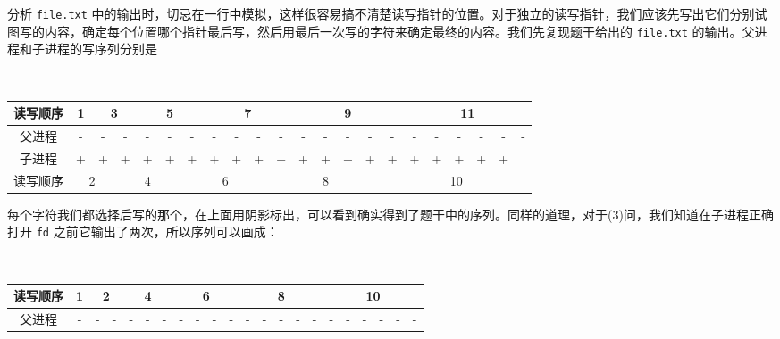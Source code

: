 \begin{problems}
        分析 \verb|file.txt| 中的输出时，切忌在一行中模拟，这样很容易搞不清楚读写指针的位置。对于独立的读写指针，我们应该先写出它们分别试图写的内容，确定每个位置哪个指针最后写，然后用最后一次写的字符来确定最终的内容。我们先复现题干给出的 \verb|file.txt| 的输出。父进程和子进程的写序列分别是
        \begin{table}[H]
            \tt
            \centering
            \begin{tabular}{cccccccccccccccccccccc}
                读写顺序 & \multicolumn{1}{c|}{1} & \multicolumn{2}{c|}{3} & \multicolumn{3}{c|}{5} & \multicolumn{4}{c|}{7} & \multicolumn{5}{c|}{9} & \multicolumn{6}{c}{11} \\ \hline
                父进程 & \multicolumn{1}{c|}{-} & \cellcolor{blue!10}- & \multicolumn{1}{c|}{-} & \cellcolor{blue!10}- & \cellcolor{blue!10}- & \multicolumn{1}{c|}{-} & \cellcolor{blue!10}- & \cellcolor{blue!10}- & \cellcolor{blue!10}- & \multicolumn{1}{c|}{-} & \cellcolor{blue!10}- & \cellcolor{blue!10}- & \cellcolor{blue!10}- & \cellcolor{blue!10}- & \multicolumn{1}{c|}{-} & \cellcolor{blue!10}- & \cellcolor{blue!10}- & \cellcolor{blue!10}- & \cellcolor{blue!10}- & \cellcolor{blue!10}- & \cellcolor{blue!10}- \\
                子进程 & \cellcolor{blue!10}+ & \multicolumn{1}{c|}{+} & \cellcolor{blue!10}+ & + & \multicolumn{1}{c|}{+} & \cellcolor{blue!10}+ & + & + & \multicolumn{1}{c|}{+} & \cellcolor{blue!10}+ & + & + & + & \multicolumn{1}{c|}{+} & \cellcolor{blue!10}+ & + & + & + & + & + &  \\ \hline
                读写顺序 & \multicolumn{2}{c|}{2} & \multicolumn{3}{c|}{4} & \multicolumn{4}{c|}{6} & \multicolumn{5}{c|}{8} & \multicolumn{7}{c}{10}
            \end{tabular}
        \end{table}
        每个字符我们都选择后写的那个，在上面用阴影标出，可以看到确实得到了题干中的序列。同样的道理，对于(3)问，我们知道在子进程正确打开 \verb|fd| 之前它输出了两次，所以序列可以画成：
        \begin{table}[H]
            \tt
            \centering
            \begin{tabular}{cccc|cccccccccccccccccc}
                读写顺序 & \multicolumn{1}{c|}{1} & \multicolumn{2}{c|}{2} & \multicolumn{3}{c|}{4} & \multicolumn{4}{c|}{6} & \multicolumn{5}{c|}{8} & \multicolumn{6}{c}{10} \\ \hline
                父进程 & \multicolumn{1}{c|}{-} & - & - & - & - & \multicolumn{1}{c|}{-} & \cellcolor{blue!10}- & - & - & \multicolumn{1}{c|}{-} & \cellcolor{blue!10}- & \cellcolor{blue!10}- & - & - & \multicolumn{1}{c|}{-} & \cellcolor{blue!10}- & \cellcolor{blue!10}- & \cellcolor{blue!10}- & \cellcolor{blue!10}- & \cellcolor{blue!10}- & \cellcolor{blue!10}- \\

\end{tabular}
\end{table}
\end{problems}
